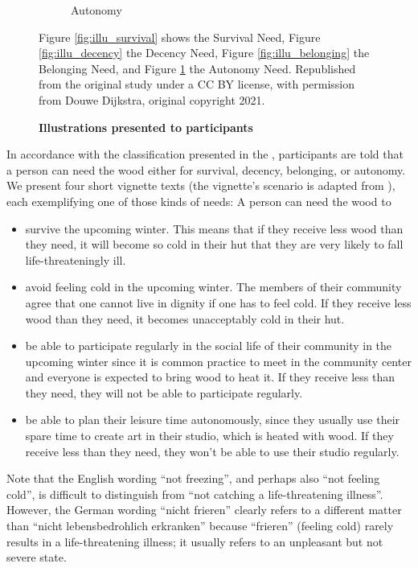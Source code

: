 \documentclass[10pt,letterpaper]{article}
\begin{document}
\begin{figure}[ht!]
\begin{subfigure}[t]{0.5\textwidth}
      \caption{Autonomy}\label{fig:illu_autonomy}
   \end{subfigure}
   \caption{\bf Illustrations presented to participants}
   Figure \ref{fig:illu_survival} shows the Survival Need, Figure \ref{fig:illu_decency} the Decency Need, Figure \ref{fig:illu_belonging} the Belonging Need, and Figure \ref{fig:illu_autonomy} the Autonomy Need. Republished from the original study under a CC BY license, with permission from Douwe Dijkstra, original copyright 2021.
   \label{fig:illu}
\end{figure}

In accordance with the classification presented in the , participants are told that a person can need the wood either for survival, decency, belonging, or autonomy.
We present four short vignette texts (the vignette's scenario is adapted from \cite{bauer_need_2022}), each exemplifying one of those kinds of needs: A person can need the wood to

\begin{itemize}
   \item survive the upcoming winter. This means that if they receive less wood than they need, it will become so cold in their hut that they are very likely to fall life-threateningly ill.
   \item avoid feeling cold in the upcoming winter. The members of their community agree that one cannot live in dignity if one has to feel cold. If they receive less wood than they need, it becomes unacceptably cold in their hut.
   \item be able to participate regularly in the social life of their community in the upcoming winter since it is common practice to meet in the community center and everyone is expected to bring wood to heat it. If they receive less than they need, they will not be able to participate regularly.
   \item be able to plan their leisure time autonomously, since they usually use their spare time to create art in their studio, which is heated with wood. If they receive less than they need, they won't be able to use their studio regularly.
\end{itemize}

Note that the English wording ``not freezing'', and perhaps also ``not feeling cold'', is difficult to distinguish from ``not catching a life-threatening illness''.
However, the German wording ``nicht frieren'' clearly refers to a different matter than ``nicht lebensbedrohlich erkranken'' because ``frieren'' (feeling cold) rarely results in a life-threatening illness; it usually refers to an unpleasant but not severe state.
\end{document}
